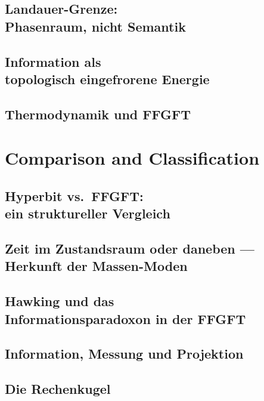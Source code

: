 \documentclass[11pt,oneside]{book}
\theoremstyle{plain}
\begin{document}
\chapter[Landauer-Grenze: Phasenraum, nicht Semantik]{Landauer-Grenze:\\ Phasenraum, nicht Semantik}

\chapter[Information als topologisch eingefrorene Energie]{Information als\\ topologisch eingefrorene Energie}

\chapter{Thermodynamik und FFGFT}


\part{Comparison and Classification}
\chapter[Hyperbit vs.\ FFGFT]{Hyperbit vs.\ FFGFT:\\ ein struktureller Vergleich}
\label{ch:vergleich_matzke_ffgft}

\chapter[Zeit im Zustandsraum]{Zeit im Zustandsraum oder daneben ---\\ Herkunft der Massen-Moden}

\chapter[Hawking und das Informationsparadoxon]{Hawking und das\\ Informationsparadoxon in der FFGFT}
\label{ch:hawking_info}

\chapter{Information, Messung und Projektion}

\chapter{Die Rechenkugel}

\end{document}
